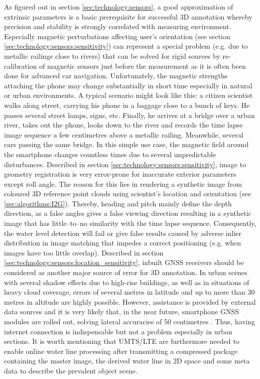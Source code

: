 \documentclass[review]{elsarticle}
\begin{document}
As figured out in section \ref{sec:technology:sensors}, a good approximation of extrinsic parameters is a basic prerequisite for successful 3D annotation whereby precision and stability is strongly correlated with measuring environment. Especially magnetic perturbations affecting user's orientation (see section \ref{sec:technology:sensors:sensitivity}) can represent a special problem (e.g. due to metallic railings close to rivers) that can be solved for rigid sources by re-calibration of magnetic sensors just before the measurement as it is often been done for advanced car navigation. Unfortunately, the magnetic strengths attaching the phone may change substantially in short time especially in natural or urban environments. A typical scenario might look like this: a citizen scientist walks along street, carrying his phone in a baggage close to a bunch of keys. He passes several street lamps, signs, etc. Finally, he arrives at a bridge over a urban river, takes out the phone, looks down to the river and records the time lapse image sequence a few centimetres above a metallic railing. Meanwhile, several cars passing the same bridge. In this simple use case, the magnetic field around the smartphone changes countless times due to several unpredictable disturbances. Described in section \ref{sec:technology:sensors:sensitivity}, image to geometry registration is very error-prone for inaccurate exterior parameters except roll angle. The reason for this lies in rendering a synthetic image from coloured 3D reference point clouds using scientist's location and orientation (see \ref{sec:algorithms:I2G}). Thereby, heading and pitch mainly define the depth direction, as a false angles gives a false viewing direction resulting in a synthetic image that has little--to--no similarity with the time lapse sequence. Consequently, the water level detection will fail or give false results caused by adverse inlier distribution in image matching that impedes a correct positioning (e.g. when images have too little overlap). Described in section \ref{sec:technology:sensors:location_sensitivity}, inbuilt \gls{GNSS} receivers should be considered as another major source of error for 3D annotation. In urban scenes with several shadow effects due to high-rise buildings, as well as in situations of heavy cloud coverage, errors of several metres in latitude and up to more than 30 metres in altitude are highly possible. However, assistance is provided by external data sources and it is very likely that, in the near future, smartphone \gls{GNSS} modules are rolled out, solving lateral accuracies of 50 centimetres \cite{Moore2017}. Thus, having internet connection is indispensable but not a problem especially in urban sections. It is worth mentioning that UMTS/LTE are furthermore needed to enable online water line processing after transmitting a compressed package containing the master image, the derived water line in 2D space and some meta data to describe the prevalent object scene.
\end{document}
